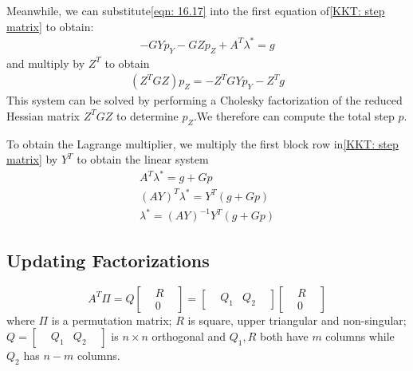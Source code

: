     Meanwhile, we can substitute\eqref{eqn: 16.17} into the first equation of\eqref{KKT: step matrix} to obtain:
    \begin{align}
        -GYp_Y - GZp_Z + A^T\lambda^* = g
    \end{align}
    and multiply by $Z^T$ to obtain
    \begin{align}
        (Z^T GZ)p_{Z} = -Z^T GYp_Y - Z^T g
    \end{align}
    This system can be solved by performing a Cholesky factorization of the reduced Hessian matrix $Z^TGZ$
    to determine $p_Z$.We therefore can compute the total step $p$.
    \par To obtain the Lagrange multiplier, we multiply the first block row in\eqref{KKT: step matrix} by $Y^T$
    to obtain the linear system
    \begin{align*}
        A^T\lambda^* = g + Gp \\
        (AY)^T\lambda^* = Y^T(g + Gp) \tag{16.20}\label{eqn: 16.20}\\
        \lambda^* = (AY)^{-1}Y^T(g + Gp)
    \end{align*}

    \subsection{Updating Factorizations} \label{subsec:-updating-factorizations}
    \[
        A^T\Pi = Q
        \begin{bmatrix}
            & R & \\
            & 0 &
        \end{bmatrix} =
        \begin{bmatrix}
            & Q_1 & Q_2 &
        \end{bmatrix}
        \begin{bmatrix}
            & R & \\
            & 0 &
        \end{bmatrix}\tag{16.50}\label{eqn: 16.50}
    \]
    where $\Pi$ is a permutation matrix; $R$ is square, upper triangular and non-singular;
     $   Q =
        \begin{bmatrix}
            & Q_1 & Q_2 &
        \end{bmatrix}
    $
    is $n\times n$ orthogonal and $Q_1, R$ both have $m$ columns while $Q_2$ has $n - m$ columns.
